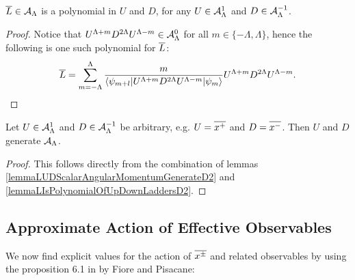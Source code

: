 \begin{lemma}\label{lemmaLIsPolynomialOfUpDownLaddersD2}
$\overline{L} \in \mathcal A_\Lambda$ is a polynomial in $U$ and $D$, for any $U \in \mathcal A^1_\Lambda$ and $D \in \mathcal A^{-1}_\Lambda$.
\end{lemma}
\begin{proof}
Notice that $U^{\Lambda+m} D^{2\Lambda}U^{\Lambda-m} \in \mathcal A^0_\Lambda$ for all $m \in \{-\Lambda, \Lambda\}$, hence the following is one such polynomial for $\overline{L}$:
\begin{equation}
    \overline{L} = \sum_{m = -\Lambda}^\Lambda \frac{m}{\langle \psi_{m+l}| U^{\Lambda+m} D^{2\Lambda}U^{\Lambda-m} | \psi_{m}\rangle} U^{\Lambda+m} D^{2\Lambda}U^{\Lambda-m}.
\end{equation}
\end{proof}

\begin{theorem}\label{theoremRaisingAndLoweringAribtraryOperatorsGenerateD2}
Let $U \in \mathcal A^1_\Lambda$ and $D \in \mathcal A^{-1}_\Lambda$ be arbitrary, e.g. $U = \overline{x^+}$ and $D = \overline{x^-}$. Then $U$ and $D$ generate $\mathcal A_\Lambda$.
\end{theorem}
\begin{proof}
This follows directly from the combination of lemmas \ref{lemmaLUDScalarAngularMomentumGenerateD2} and \ref{lemmaLIsPolynomialOfUpDownLaddersD2}.
\end{proof}

\subsection{Approximate Action of Effective Observables}

We now find explicit values for the action of $\overline{x^\pm}$ and related observables by using the proposition 6.1 in \cite{Fiore2018} by Fiore and Pisacane:

